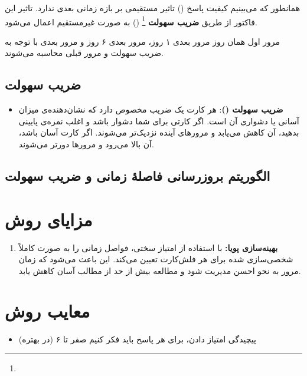 \documentclass[12pt]{report}
\begin{document}
همانطور که می‌بینیم
کیفیت پاسخ
()
تاثیر مستقیمی بر
بازه زمانی بعدی ندارد.
تاثیر این فاکتور از طریق
\textbf{ضریب سهولت}
\footnote{}
()
به صورت غیرمستقیم اعمال می‌شود.


مرور اول همان روز مرور بعدی ۱ روز، مرور بعدی ۶ روز و مرور بعدی با توجه به ضریب سهولت و مرور قبلی محاسبه می‌شوند.

\subsection{ضریب سهولت}
\begin{itemize}
    \item \textbf{ضریب سهولت ()}: هر کارت یک ضریب مخصوص دارد که نشان‌دهنده‌ی میزان آسانی یا دشواری آن است. اگر کارتی برای شما دشوار باشد و اغلب نمره‌ی پایینی بدهید،  آن کاهش می‌یابد و مرورهای آینده نزدیک‌تر می‌شوند. اگر کارت آسان باشد،  آن بالا می‌رود و مرورها دورتر می‌شوند.
\end{itemize}

\subsection{الگوریتم بروزرسانی فاصلهٔ زمانی و ضریب سهولت}

\section{مزایای روش }
\begin{enumerate}
    \item \textbf{بهینه‌سازی پویا:}  با استفاده از امتیاز سختی، فواصل زمانی را به صورت کاملاً شخصی‌سازی شده برای هر فلش‌کارت تعیین می‌کند. این باعث می‌شود که زمان مرور به نحو احسن مدیریت شود و مطالعه بیش از حد از مطالب آسان کاهش یابد.
\end{enumerate}

\section{معایب روش }
\begin{itemize}
    \item پیچیدگی امتیاز دادن، برای هر پاسخ باید فکر کنیم صفر تا ۶ (در  بهتره)
\end{itemize}

\end{document}
